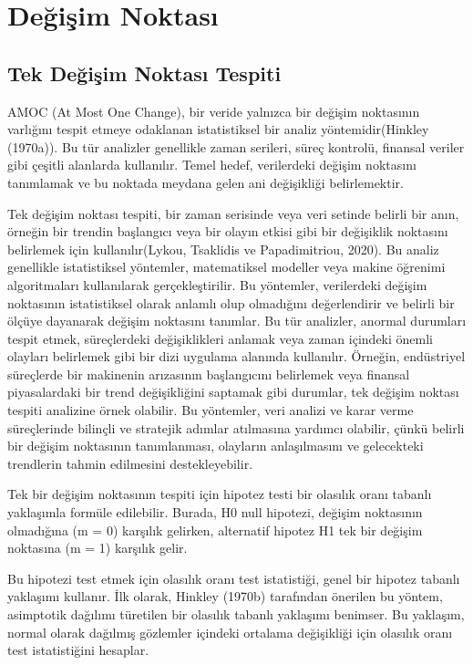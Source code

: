 \documentclass[12pt,twoside]{deuthesis}
\begin{document}
\chapter{Değişim Noktası}\label{Bolum2}

\section{Tek Değişim Noktası Tespiti}\label{tek-deux11fiux15fim-noktasux131-tespiti}

AMOC (At Most One Change), bir veride yalnızca bir değişim noktasının varlığını tespit etmeye odaklanan istatistiksel bir analiz yöntemidir(Hinkley (1970a)). Bu tür analizler genellikle zaman serileri, süreç kontrolü, finansal veriler gibi çeşitli alanlarda kullanılır. Temel hedef, verilerdeki değişim noktasını tanımlamak ve bu noktada meydana gelen ani değişikliği belirlemektir.

Tek değişim noktası tespiti, bir zaman serisinde veya veri setinde belirli bir anın, örneğin bir trendin başlangıcı veya bir olayın etkisi gibi bir değişiklik noktasını belirlemek için kullanılır(Lykou, Tsaklidis ve Papadimitriou, 2020). Bu analiz genellikle istatistiksel yöntemler, matematiksel modeller veya makine öğrenimi algoritmaları kullanılarak gerçekleştirilir. Bu yöntemler, verilerdeki değişim noktasının istatistiksel olarak anlamlı olup olmadığını değerlendirir ve belirli bir ölçüye dayanarak değişim noktasını tanımlar. Bu tür analizler, anormal durumları tespit etmek, süreçlerdeki değişiklikleri anlamak veya zaman içindeki önemli olayları belirlemek gibi bir dizi uygulama alanında kullanılır. Örneğin, endüstriyel süreçlerde bir makinenin arızasının başlangıcını belirlemek veya finansal piyasalardaki bir trend değişikliğini saptamak gibi durumlar, tek değişim noktası tespiti analizine örnek olabilir. Bu yöntemler, veri analizi ve karar verme süreçlerinde bilinçli ve stratejik adımlar atılmasına yardımcı olabilir, çünkü belirli bir değişim noktasının tanımlanması, olayların anlaşılmasını ve gelecekteki trendlerin tahmin edilmesini destekleyebilir.

Tek bir değişim noktasının tespiti için hipotez testi bir olasılık oranı tabanlı yaklaşımla formüle edilebilir. Burada, H0 null hipotezi, değişim noktasının olmadığına (m = 0) karşılık gelirken, alternatif hipotez H1 tek bir değişim noktasına (m = 1) karşılık gelir.

Bu hipotezi test etmek için olasılık oranı test istatistiği, genel bir hipotez tabanlı yaklaşımı kullanır. İlk olarak, Hinkley (1970b) tarafından önerilen bu yöntem, asimptotik dağılımı türetilen bir olasılık tabanlı yaklaşımı benimser. Bu yaklaşım, normal olarak dağılmış gözlemler içindeki ortalama değişikliği için olasılık oranı test istatistiğini hesaplar.
\end{document}
